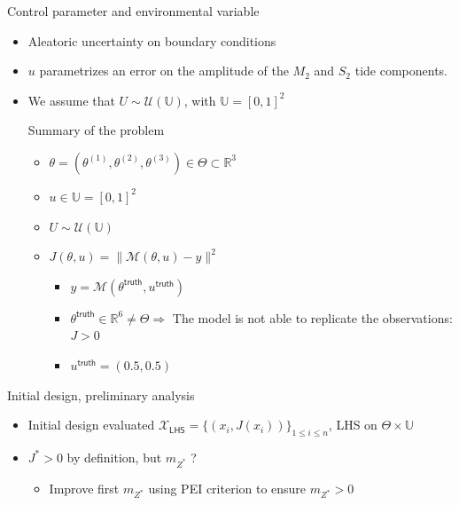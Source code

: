 \documentclass[10pt,aspectratio=169,usepdftitle=false]{beamer}
\newcommand\manupath{/home/victor/acadwriting/Manuscrit/Text/}
\newcommand{\Uspace}{\mathbb{U}}
\newcommand{\Kspace}{\Theta}
\newcommand{\kk}{\theta}
\newcommand{\uu}{u}
\newcommand{\UU}{U}
\begin{document}
\begin{frame}{Control parameter and environmental variable}
  \begin{itemize}
  \item Aleatoric uncertainty on boundary conditions
    \item $\uu$ parametrizes an error on the amplitude of the $M_2$ and
    $S_2$ tide components.
  \item We assume that $\UU \sim \mathcal{U}\left(\Uspace\right)$, with $\Uspace = [0,1]^2$


    \begin{block}{Summary of the problem}
      \begin{itemize}
      \item $\kk = (\kk^{(1)}, \kk^{(2)}, \kk^{(3)})\in \Kspace \subset \mathbb{R}^3$
      \item $\uu \in \Uspace=[0, 1]^2$
      \item $\UU \sim \mathcal{U}\left(\Uspace\right)$
      \item $J(\kk, \uu) = \|\mathcal{M}(\kk, \uu) - y\|^2$
        \begin{itemize}
        \item  $y=\mathcal{M}(\kk^{\mathsf{truth}}, \uu^{\mathsf{truth}})$
      \item $\kk^{\mathsf{truth}}\in\mathbb{R}^6 \neq \Kspace \Rightarrow$ The
        model is not able to replicate the observations: $J>0$
      \item $\uu^{\mathsf{truth}} = (0.5, 0.5)$
      \end{itemize}
      \end{itemize}
    \end{block}
\end{itemize}


\end{frame}


\begin{frame}{Initial design, preliminary analysis}
\begin{itemize}
\item Initial design evaluated $\mathcal{X}_{\mathsf{LHS}} = \{(x_i, J(x_i))\}_{1 \leq i \leq n}$, LHS on $\Kspace \times \Uspace$
\item $J^*> 0$ by definition, but $m_{Z^*}$ ?
  \begin{itemize}
  \item<2-> Improve first $m_{Z^*}$ using PEI criterion to ensure $m_{Z^*} > 0$
  \end{itemize} 
\end{itemize}
\end{frame}
\end{document}
